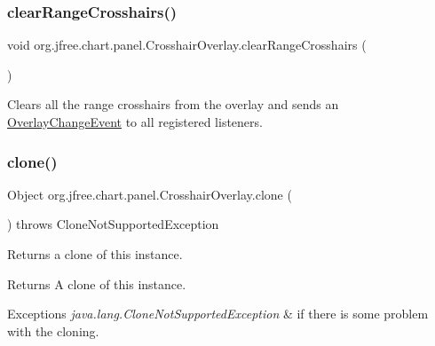 \subsubsection{\texorpdfstring{clear\+Range\+Crosshairs()}{clearRangeCrosshairs()}}
{\footnotesize\ttfamily void org.\+jfree.\+chart.\+panel.\+Crosshair\+Overlay.\+clear\+Range\+Crosshairs (\begin{DoxyParamCaption}{ }\end{DoxyParamCaption})}

Clears all the range crosshairs from the overlay and sends an \mbox{\hyperlink{}{Overlay\+Change\+Event}} to all registered listeners. \mbox{\label{classorg_1_1jfree_1_1chart_1_1panel_1_1_crosshair_overlay_a271ed6335b4d7f2df118b3617150a609}} 
\subsubsection{\texorpdfstring{clone()}{clone()}}
{\footnotesize\ttfamily Object org.\+jfree.\+chart.\+panel.\+Crosshair\+Overlay.\+clone (\begin{DoxyParamCaption}{ }\end{DoxyParamCaption}) throws Clone\+Not\+Supported\+Exception}

Returns a clone of this instance.

\begin{DoxyReturn}{Returns}
A clone of this instance.
\end{DoxyReturn}

\begin{DoxyExceptions}{Exceptions}
{\em java.\+lang.\+Clone\+Not\+Supported\+Exception} & if there is some problem with the cloning. \\
\hline
\end{DoxyExceptions}
\mbox{\label{classorg_1_1jfree_1_1chart_1_1panel_1_1_crosshair_overlay_af380a18bde073963bd8e04e8bafa9d1d}} 
